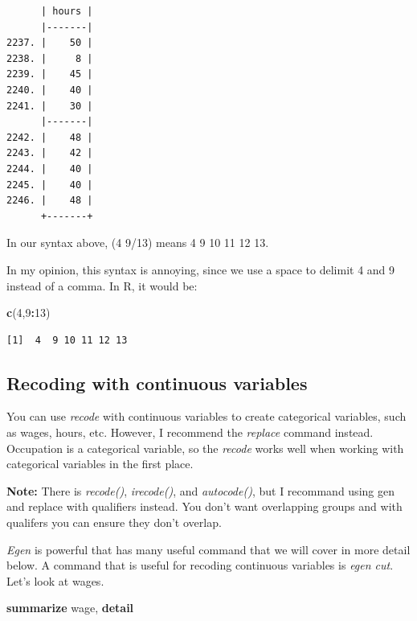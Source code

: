 \documentclass[
]{book}
\newenvironment{Shaded}{\begin{snugshade}}{\end{snugshade}}
\newcommand{\DecValTok}[1]{\textcolor[rgb]{0.00,0.00,0.81}{#1}}
\newcommand{\FunctionTok}[1]{\textcolor[rgb]{0.13,0.29,0.53}{\textbf{#1}}}
\newcommand{\KeywordTok}[1]{\textcolor[rgb]{0.13,0.29,0.53}{\textbf{#1}}}
\newcommand{\NormalTok}[1]{#1}
\newcommand{\SpecialCharTok}[1]{\textcolor[rgb]{0.81,0.36,0.00}{\textbf{#1}}}
\begin{document}
\begin{verbatim}
      | hours |
      |-------|
2237. |    50 |
2238. |     8 |
2239. |    45 |
2240. |    40 |
2241. |    30 |
      |-------|
2242. |    48 |
2243. |    42 |
2244. |    40 |
2245. |    40 |
2246. |    48 |
      +-------+
\end{verbatim}

In our syntax above, (4 9/13) means 4 9 10 11 12 13.

In my opinion, this syntax is annoying, since we use a space to delimit 4 and 9 instead of a comma. In R, it would be:

\begin{Shaded}
\begin{Highlighting}[]
\FunctionTok{c}\NormalTok{(}\DecValTok{4}\NormalTok{,}\DecValTok{9}\SpecialCharTok{:}\DecValTok{13}\NormalTok{)}
\end{Highlighting}
\end{Shaded}

\begin{verbatim}
[1]  4  9 10 11 12 13
\end{verbatim}

\subsection{Recoding with continuous variables}\label{recoding-with-continuous-variables}

You can use \emph{recode} with continuous variables to create categorical variables, such as wages, hours, etc. However, I recommend the \emph{replace} command instead. Occupation is a categorical variable, so the \emph{recode} works well when working with categorical variables in the first place.

\textbf{Note:} There is \emph{recode()}, \emph{irecode()}, and \emph{autocode()}, but I recommand using gen and replace with qualifiers instead. You don't want overlapping groups and with qualifers you can ensure they don't overlap.

\emph{Egen} is powerful that has many useful command that we will cover in more detail below. A command that is useful for recoding continuous variables is \emph{egen cut}. Let's look at wages.

\begin{Shaded}
\begin{Highlighting}[]
\KeywordTok{summarize}\NormalTok{ wage, }\KeywordTok{detail}
\end{Highlighting}
\end{Shaded}
\end{document}
